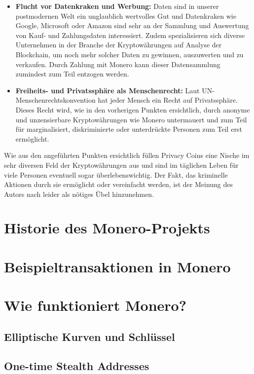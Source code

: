 \begin{itemize}
    \item \textbf{Flucht vor Datenkraken und Werbung:} Daten sind in unserer postmodernen Welt ein unglaublich wertvolles Gut und Datenkraken wie Google, Microsoft oder Amazon sind sehr an der Sammlung und Auswertung von Kauf- und Zahlungsdaten interessiert.
    Zudem spezialisieren sich diverse Unternehmen in der Branche der Kryptowährungen auf Analyse der Blockchain, um noch mehr solcher Daten zu gewinnen, auszuwerten und zu verkaufen. Durch Zahlung mit Monero kann dieser Datensammlung zumindest zum Teil entzogen werden.
    \item \textbf{Freiheits- und Privatssphäre als Menschenrecht:} Laut UN-Menschenrechtskonvention hat jeder Mensch ein Recht auf Privatssphäre\cite[vgl. Artikel 12]{UniNations1948}. Dieses Recht wird, wie in den vorherigen Punkten ersichtlich,
    durch anonyme und unzensierbare Kryptowährungen wie Monero untermauert und zum Teil für marginalisiert, diskriminierte oder unterdrückte Personen zum Teil erst ermöglicht.
\end{itemize}
Wie aus den angeführten Punkten ersichtlich füllen Privacy Coins eine Nische im sehr diversen Feld der Kryptowährungen aus und sind im täglichen Leben für viele Personen eventuell sogar überlebenswichtig. Der Fakt, das kriminelle Aktionen durch sie ermöglicht oder
vereinfacht werden, ist der Meinung des Autors nach leider als nötiges Übel hinzunehmen.

\chapter{Historie des Monero-Projekts}

\chapter{Beispieltransaktionen in Monero}

\chapter{Wie funktioniert Monero?} \label{tech}

\section{Elliptische Kurven und Schlüssel}

\section{One-time Stealth Addresses} \label{stealth}

